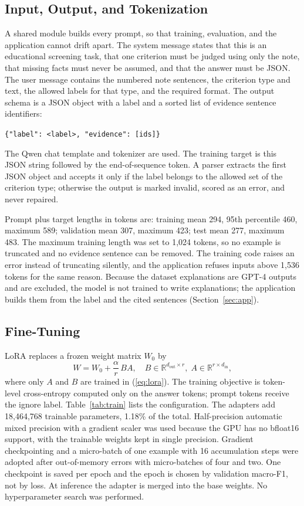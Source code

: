 \documentclass[conference]{IEEEtran}
\begin{document}
\subsection{Input, Output, and Tokenization}
A shared module builds every prompt, so that training, evaluation, and the application cannot drift apart. The system message states that this is an educational screening task, that one criterion must be judged using only the note, that missing facts must never be assumed, and that the answer must be JSON. The user message contains the numbered note sentences, the criterion type and text, the allowed labels for that type, and the required format. The output schema is a JSON object with a label and a sorted list of evidence sentence identifiers:
\begin{center}
\small\texttt{\{"label": <label>, "evidence": [ids]\}}
\end{center}
The Qwen chat template and tokenizer are used. The training target is this JSON string followed by the end-of-sequence token. A parser extracts the first JSON object and accepts it only if the label belongs to the allowed set of the criterion type; otherwise the output is marked invalid, scored as an error, and never repaired.

Prompt plus target lengths in tokens are: training mean 294, 95th percentile 460, maximum 589; validation mean 307, maximum 423; test mean 277, maximum 483. The maximum training length was set to 1,024 tokens, so no example is truncated and no evidence sentence can be removed. The training code raises an error instead of truncating silently, and the application refuses inputs above 1,536 tokens for the same reason. Because the dataset explanations are GPT-4 outputs and are excluded, the model is not trained to write explanations; the application builds them from the label and the cited sentences (Section~\ref{sec:app}).

\subsection{Fine-Tuning}
LoRA replaces a frozen weight matrix $W_0$ by
\begin{equation}
W = W_0 + \frac{\alpha}{r}\,BA, \quad B\in\mathbb{R}^{d_{\text{out}}\times r},\; A\in\mathbb{R}^{r\times d_{\text{in}}},
\label{eq:lora}
\end{equation}
where only $A$ and $B$ are trained in (\ref{eq:lora}). The training objective is token-level cross-entropy computed only on the answer tokens; prompt tokens receive the ignore label. Table~\ref{tab:train} lists the configuration. The adapters add 18,464,768 trainable parameters, 1.18\% of the total. Half-precision automatic mixed precision with a gradient scaler was used because the GPU has no bfloat16 support, with the trainable weights kept in single precision. Gradient checkpointing and a micro-batch of one example with 16 accumulation steps were adopted after out-of-memory errors with micro-batches of four and two. One checkpoint is saved per epoch and the epoch is chosen by validation macro-F1, not by loss. At inference the adapter is merged into the base weights. No hyperparameter search was performed.
\end{document}
